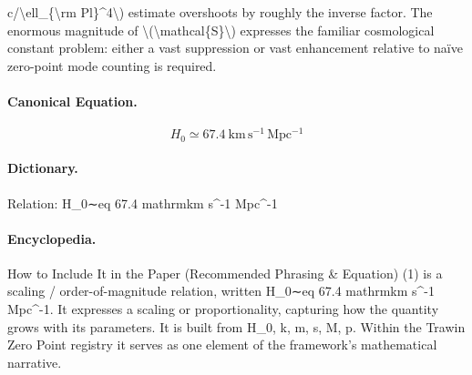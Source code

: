 c/\textbackslash{}ell\_\{\textbackslash{}rm Pl\}\textasciicircum{}4\textbackslash{}) estimate overshoots by roughly the inverse factor. The enormous magnitude of \textbackslash{}(\textbackslash{}mathcal\{S\}\textbackslash{}) expresses the familiar cosmological constant problem: either a vast suppression or vast enhancement relative to naïve zero-point mode counting is required.

\paragraph{Canonical Equation.}
\[
H_0\simeq 67.4\ \mathrm{km\,s^{-1}\,Mpc^{-1}}
\]

\paragraph{Dictionary.}
Relation: H\_0∼eq 67.4 mathrmkm s\textasciicircum{}-1 Mpc\textasciicircum{}-1

\paragraph{Encyclopedia.}
How to Include It in the Paper (Recommended Phrasing \& Equation) (1) is a scaling / order-of-magnitude relation, written H\_0∼eq 67.4 mathrmkm s\textasciicircum{}-1 Mpc\textasciicircum{}-1. It expresses a scaling or proportionality, capturing how the quantity grows with its parameters. It is built from H\_0, k, m, s, M, p. Within the Trawin Zero Point registry it serves as one element of the framework's mathematical narrative.
